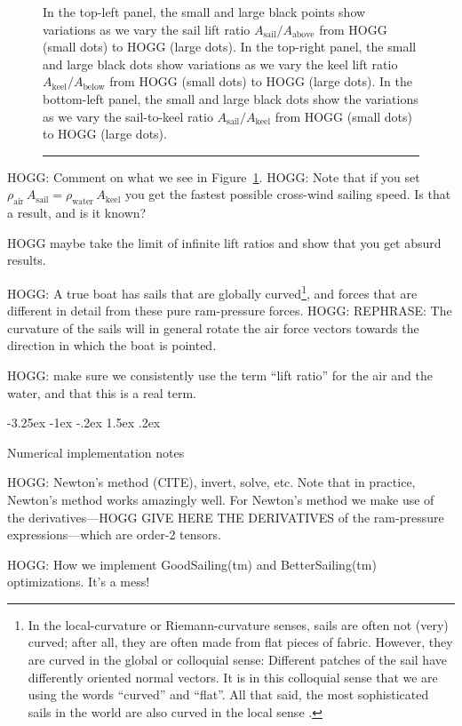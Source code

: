 \documentclass[letterpaper]{article}
\makeatletter
\newcommand{\air}{\text{air}}
\newcommand{\water}{\text{water}}
\newcommand{\sail}{\text{sail}}
\newcommand{\keel}{\text{keel}}
\renewcommand{\above}{\text{above}}
\newcommand{\below}{\text{below}}
\newcommand{\figref}[1]{Figure~\ref{#1}}
\renewcommand\section{\@startsection {section}{1}{\z@}%
  {-3.25ex \@plus -1ex \@minus -.2ex}%
  {1.5ex \@plus .2ex}%
  {\raggedright\normalfont\large\bfseries}}
\newcommand{\figurerule}{\rule[1ex]{\textwidth}{0.2pt}}
\makeatother
\begin{document}
\begin{figure}[t!]
{  In the top-left panel, the small and large black points show variations as we vary the sail lift ratio $A_\sail/A_\above$ from HOGG (small dots) to HOGG (large dots).
  In the top-right panel, the small and large black dots show variations as we vary the keel lift ratio $A_\keel/A_\below$ from HOGG (small dots) to HOGG (large dots).
  In the bottom-left panel, the small and large black dots show the variations as we vary the sail-to-keel ratio $A_\sail/A_\keel$ from HOGG (small dots) to HOGG (large dots).\label{fig:design}}
  \figurerule
\end{figure}

HOGG: Comment on what we see in \figref{fig:design}. HOGG: Note that if you set $\rho_\air\,A_\sail=\rho_\water\,A_\keel$ you get the fastest possible cross-wind sailing speed. Is that a result, and is it known?

HOGG maybe take the limit of infinite lift ratios and show that you get absurd results.

HOGG: 
A true boat has sails that are globally curved\footnote{%
In the local-curvature or Riemann-curvature senses, sails are often not (very) curved; after all, they are often made from flat pieces of fabric.
However, they are curved in the global or colloquial sense: Different patches of the sail have differently oriented normal vectors.
It is in this colloquial sense that we are using the words ``curved'' and ``flat''.
All that said, the most sophisticated sails in the world are also curved in the local sense \cite{sails}.},
and forces that are different in detail from these pure ram-pressure forces.
HOGG: REPHRASE: The curvature of the sails will in general rotate the air force vectors towards the direction in which the boat is pointed.

HOGG: make sure we consistently use the term ``lift ratio'' for the air and the water, and that this is a real term.

\section{Numerical implementation notes}\label{sec:implementation}

HOGG: Newton's method (CITE), invert, solve, etc.
Note that in practice, Newton's method works amazingly well.
For Newton's method we make use of the derivatives---HOGG GIVE HERE THE DERIVATIVES of the ram-pressure expressions---which are order-2 tensors.

HOGG: How we implement GoodSailing(tm) and BetterSailing(tm) optimizations. It's a mess!
\end{document}
